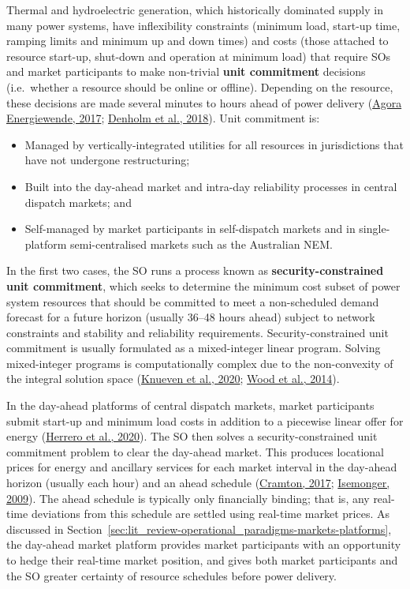 \documentclass[12pt,a4paper,]{report}
\providecommand{\tightlist}{%
  \setlength{\itemsep}{0pt}\setlength{\parskip}{0pt}}
\begin{document}
Thermal and hydroelectric generation, which historically dominated
supply in many power systems, have inflexibility constraints (minimum
load, start-up time, ramping limits and minimum up and down times) and
costs (those attached to resource start-up, shut-down and operation at
minimum load) that require SOs and market participants to make
non-trivial \textbf{unit commitment} decisions (i.e.~whether a resource
should be online or offline). Depending on the resource, these decisions
are made several minutes to hours ahead of power delivery
(\protect\hyperlink{ref-agoraenergiewendeFlexibilityThermalPower2017}{Agora
Energiewende, 2017};
\protect\hyperlink{ref-denholmHowLowCan2018}{Denholm et al., 2018}).
Unit commitment is:

\begin{itemize}
\tightlist
\item
  Managed by vertically-integrated utilities for all resources in
  jurisdictions that have not undergone restructuring;
\item
  Built into the day-ahead market and intra-day reliability processes in
  central dispatch markets; and
\item
  Self-managed by market participants in self-dispatch markets and in
  single-platform semi-centralised markets such as the Australian NEM.
\end{itemize}

In the first two cases, the SO runs a process known as
\textbf{security-constrained unit commitment}, which seeks to determine
the minimum cost subset of power system resources that should be
committed to meet a non-scheduled demand forecast for a future horizon
(usually 36--48 hours ahead) subject to network constraints and
stability and reliability requirements. Security-constrained unit
commitment is usually formulated as a mixed-integer linear program.
Solving mixed-integer programs is computationally complex due to the
non-convexity of the integral solution space
(\protect\hyperlink{ref-knuevenMixedintegerProgrammingFormulations2020}{Knueven
et al., 2020};
\protect\hyperlink{ref-woodPowerGenerationOperation2014}{Wood et al.,
2014}).

In the day-ahead platforms of central dispatch markets, market
participants submit start-up and minimum load costs in addition to a
piecewise linear offer for energy
(\protect\hyperlink{ref-herreroEvolvingBiddingFormats2020}{Herrero et
al., 2020}). The SO then solves a security-constrained unit commitment
problem to clear the day-ahead market. This produces locational prices
for energy and ancillary services for each market interval in the
day-ahead horizon (usually each hour) and an ahead schedule
(\protect\hyperlink{ref-cramtonElectricityMarketDesign2017}{Cramton,
2017}; \protect\hyperlink{ref-isemongerEvolvingDesignRTO2009}{Isemonger,
2009}). The ahead schedule is typically only financially binding; that
is, any real-time deviations from this schedule are settled using
real-time market prices. As discussed in
Section~\ref{sec:lit_review-operational_paradigms-markets-platforms},
the day-ahead market platform provides market participants with an
opportunity to hedge their real-time market position, and gives both
market participants and the SO greater certainty of resource schedules
before power delivery.
\end{document}
